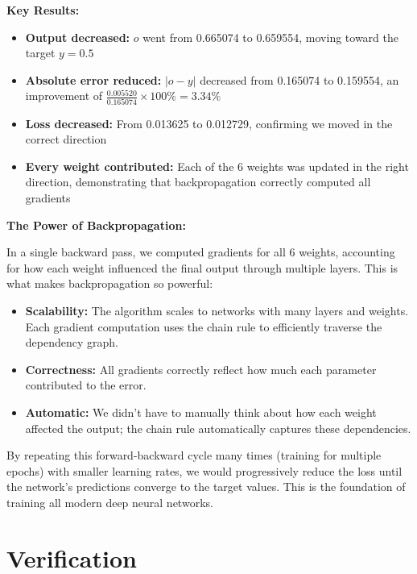 \documentclass[12pt]{article}
\begin{document}
\vspace{0.3cm}

\noindent\textbf{Key Results:}

\begin{itemize}
    \item \textbf{Output decreased:} $o$ went from 0.665074 to 0.659554, moving toward the target $y = 0.5$
    \item \textbf{Absolute error reduced:} $|o - y|$ decreased from 0.165074 to 0.159554, an improvement of $\frac{0.005520}{0.165074} \times 100\% = 3.34\%$
    \item \textbf{Loss decreased:} From 0.013625 to 0.012729, confirming we moved in the correct direction
    \item \textbf{Every weight contributed:} Each of the 6 weights was updated in the right direction, demonstrating that backpropagation correctly computed all gradients
\end{itemize}

\noindent\textbf{The Power of Backpropagation:}

In a single backward pass, we computed gradients for all 6 weights, accounting for how each weight influenced the final output through multiple layers. This is what makes backpropagation so powerful:

\begin{itemize}
    \item \textbf{Scalability:} The algorithm scales to networks with many layers and weights. Each gradient computation uses the chain rule to efficiently traverse the dependency graph.
    \item \textbf{Correctness:} All gradients correctly reflect how much each parameter contributed to the error.
    \item \textbf{Automatic:} We didn't have to manually think about how each weight affected the output; the chain rule automatically captures these dependencies.
\end{itemize}

By repeating this forward-backward cycle many times (training for multiple epochs) with smaller learning rates, we would progressively reduce the loss until the network's predictions converge to the target values. This is the foundation of training all modern deep neural networks.

\section*{Verification}
\end{document}
